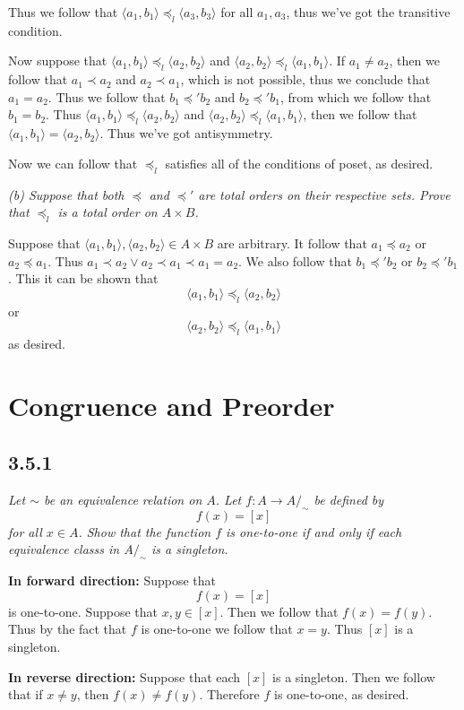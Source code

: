 \documentclass[11pt,oneside,titlepage]{book}
\newcommand{\eangle}[1]{\langle #1 \rangle}
\begin{document}
Thus we follow that $\eangle{a_1, b_1} \preceq_l \eangle{a_3, b_3}$ for all $a_1, a_3$, thus
we've got the transitive condition.

Now suppose that $\eangle{a_1, b_1} \preceq_l \eangle{a_2, b_2}$ and
$\eangle{a_2, b_2} \preceq_l \eangle{a_1, b_1}$. If $a_1 \neq a_2$, then we follow that
$a_1 \prec a_2$ and $a_2 \prec a_1$, which is not possible, thus we conclude that $a_1 = a_2$.
Thus we follow that $b_1 \preceq' b_2$ and $b_2 \preceq' b_1$, from which we follow that
$b_1 = b_2$. Thus $\eangle{a_1, b_1} \preceq_l \eangle{a_2, b_2}$ and
$\eangle{a_2, b_2} \preceq_l \eangle{a_1, b_1}$, then we follow that
$\eangle{a_1, b_1} = \eangle{a_2, b_2}$. Thus we've got antisymmetry.

Now we can follow that $\preceq_l$ satisfies all of the conditions of poset, as desired.

\textit{(b) Suppose that both $\preceq$ and $\preceq'$ are total orders on their respective sets.
  Prove that $\preceq_l$ is a total order on $A \times B$.}

Suppose that $\eangle{a_1, b_1}, \eangle{a_2, b_2}  \in A \times B$ are arbitrary. It follow that
$a_1 \preceq a_2$ or $a_2 \preceq a_1$. Thus $a_1 \prec a_2 \lor a_2 \prec a_1 \prec a_1 = a_2$.
We also follow that $b_1 \preceq' b_2$ or $b_2 \preceq' b_1$. This it can be shown that
$$\eangle{a_1, b_1} \preceq_l \eangle{a_2, b_2}$$
or
$$\eangle{a_2, b_2} \preceq_l \eangle{a_1, b_1}$$
as desired.

\section{Congruence and Preorder}

\subsection*{3.5.1}

\textit{Let $\sim$ be an equivalence relation on $A$. Let $f: A \to A/_\sim$ be defined by
  $$f(x) = [x]$$
  for all $x \in A$. Show that the function $f$ is one-to-one if and only if each equivalence
  classs in $A/_\sim$ is a singleton.}

\textbf{In forward direction: }
Suppose that
$$f(x) = [x]$$
is one-to-one. Suppose that $x, y \in [x]$. Then we follow that $f(x) = f(y)$. Thus by the fact
that $f$ is one-to-one we follow that $x = y$. Thus $[x]$ is a singleton.

\textbf{In reverse direction: }
Suppose that each $[x]$ is a singleton. Then we follow that if $x \neq y$, then $f(x) \neq f(y)$.
Therefore $f$ is one-to-one, as desired.
\end{document}
